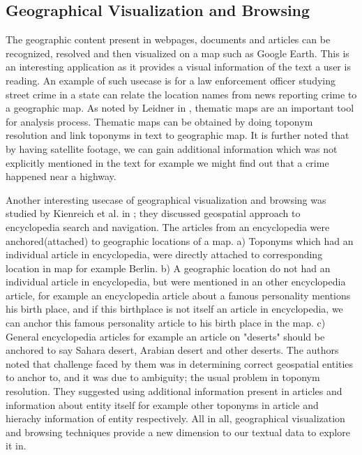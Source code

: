\documentclass[
     11pt,         %
     a4paper,      %
     oneside,
     ]{article}
\begin{document}
\subsection{Geographical Visualization and Browsing} The geographic content present in webpages, documents and articles can be recognized, resolved and then visualized on a map such as Google Earth. This is an interesting application as it provides a visual information of the text a user is reading. An example of such usecase is for a law enforcement officer studying street crime in a state can relate the location names from news reporting crime to a geographic map. As noted by Leidner in \cite{Leidner:2008:PhD}, thematic maps are an important tool for analysis process. Thematic maps can be obtained by doing toponym resolution and link toponyms in text to geographic map. It is further noted that by having satellite footage, we can gain additional information which was not explicitly mentioned in the text for example we might find out that a crime happened near a highway.
 
Another interesting usecase of geographical visualization and browsing was studied by Kienreich et al. in \cite{Kienreich:2006:GAE:1153927.1154675}; they discussed geospatial approach to encyclopedia search and navigation. The articles from an encyclopedia were anchored(attached) to geographic locations of a map. a) Toponyms which had an individual article in encyclopedia, were directly attached to corresponding location in map for example Berlin. b) A geographic location do not had an individual article in encyclopedia, but were mentioned in an other encyclopedia article, for example an encyclopedia article about a famous personality mentions his birth place, and if this birthplace is not itself an article in encyclopedia, we can anchor this famous personality article to his birth place in the map. c) General encyclopedia articles for example an article on "deserts" should be anchored to say Sahara desert, Arabian desert and other deserts. The authors noted that challenge faced by them was in determining correct geospatial entities to anchor to, and it was due to ambiguity; the usual problem in toponym resolution. They suggested using additional information present in articles and information about entity itself for example other toponyms in article and hierachy information of entity respectively. All in all, geographical visualization and browsing techniques provide a new dimension to our textual data to explore it in.
\end{document}
